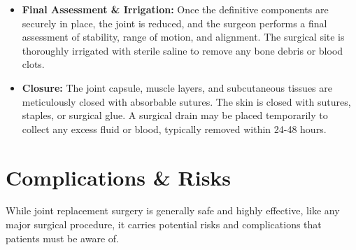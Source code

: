 \begin{itemize}
  \item \textbf{Final Assessment \& Irrigation:} Once the definitive components are securely in place, the joint is reduced, and the surgeon performs a final assessment of stability, range of motion, and alignment. The surgical site is thoroughly irrigated with sterile saline to remove any bone debris or blood clots.
  \item \textbf{Closure:} The joint capsule, muscle layers, and subcutaneous tissues are meticulously closed with absorbable sutures. The skin is closed with sutures, staples, or surgical glue. A surgical drain may be placed temporarily to collect any excess fluid or blood, typically removed within 24-48 hours.
\end{itemize}

\section*{Complications \& Risks}
While joint replacement surgery is generally safe and highly effective, like any major surgical procedure, it carries potential risks and complications that patients must be aware of.

